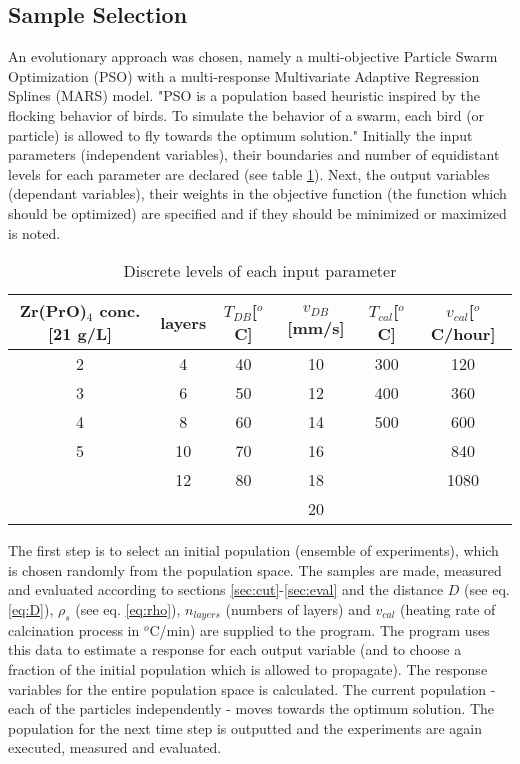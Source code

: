 \documentclass[a4paper]{article}
\begin{document}
\subsection{Sample Selection}
\label{sec:ss}
An evolutionary approach was chosen, namely a multi-objective Particle Swarm Optimization (PSO) with a multi-response
Multivariate Adaptive Regression Splines (MARS) model\cite{Villanova2010,Kennedy1995,Breiman1997,Carta2011}.
%
"PSO is a population based heuristic inspired by the flocking behavior of birds. 
To simulate the behavior of a swarm, each bird (or particle) is allowed to fly towards the optimum solution."\cite{Villanova2010}
%
Initially the input parameters (independent variables), their boundaries and number of equidistant levels for each parameter are declared (see table \ref{tab:input}).
Next, the output variables (dependant variables), their weights in the objective function (the function which should be optimized) are specified and if they should be minimized or maximized is noted.
%
\begin{table}[htb]
	\centering
	\begin{tabular}{cc cc cc}
		\hline
		Zr(PrO)$_4$ conc. [21 g/L]	&layers	&$T_{DB}$[$^o$C]	&$v_{DB}$[mm/s]	&$T_{cal}$[$^o$C]	&$v_{cal}$[$^o$C/hour]	\\
		\hline
		2				&4		&40					&10				&300				&120	\\
		3				&6		&50					&12				&400				&360	\\
		4				&8		&60					&14				&500				&600	\\
		5				&10		&70					&16				&					&840	\\
						&12		&80					&18				&					&1080	\\
						&		&					&20				&					&		\\
		\hline
	\end{tabular}
	\caption{Discrete levels of each input parameter}
	\label{tab:input}
\end{table}

The first step is to select an initial population (ensemble of experiments), which is chosen randomly from the population space. 
The samples are made, measured and evaluated according to sections \ref{sec:cut}-\ref{sec:eval} and the distance $D$ (see eq. \ref{eq:D}), $\rho_s$ (see eq. \ref{eq:rho}), $n_{layers}$ (numbers of layers) and $v_{cal}$ (heating rate of calcination process in $^o$C/min) are supplied to the program. 
The program uses this data to estimate a response for each output variable (and to choose a fraction of the initial population which is allowed to propagate).
The response variables for the entire population space is calculated. 
The current population - each of the particles independently - moves towards the optimum solution.
The population for the next time step is outputted and the experiments are again executed, measured and evaluated.
\end{document}
